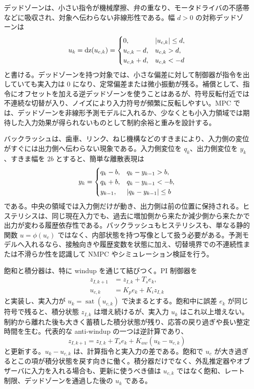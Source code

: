 デッドゾーンは、小さい指令が機械摩擦、弁の重なり、モータドライバの不感帯などに吸収され、対象へ伝わらない非線形性である。幅 $d>0$ の対称デッドゾーンは
\begin{equation}
  u_k=\operatorname{dz}(u_{c,k})=
  \begin{cases}
    0, & \left|u_{c,k}\right|\le d,\\
    u_{c,k}-d, & u_{c,k}>d,\\
    u_{c,k}+d, & u_{c,k}<-d
  \end{cases}
\end{equation}
と書ける。デッドゾーンを持つ対象では、小さな偏差に対して制御器が指令を出していても実入力は 0 になり、定常偏差または微小振動が残る。補償として、指令にオフセットを加える逆デッドゾーンを使うことはあるが、符号反転付近では不連続な切替が入り、ノイズにより入力符号が頻繁に反転しやすい。MPC では、デッドゾーンを非線形予測モデルに入れるか、少なくとも小入力領域では期待した入力効果が得られないものとして制約余裕と重みを設計する。

バックラッシュは、歯車、リンク、ねじ機構などのすきまにより、入力側の変位がすぐには出力側へ伝わらない現象である。入力側変位を $q_k$、出力側変位を $y_k$、すきま幅を $2b$ とすると、簡単な離散表現は
\begin{equation}
  y_k=
  \begin{cases}
    q_k-b, & q_k-y_{k-1}>b,\\
    q_k+b, & q_k-y_{k-1}<-b,\\
    y_{k-1}, & \left|q_k-y_{k-1}\right|\le b
  \end{cases}
\end{equation}
である。中央の領域では入力側だけが動き、出力側は前の位置に保持される。ヒステリシスは、同じ現在入力でも、過去に増加側から来たか減少側から来たかで出力が変わる履歴依存性である。バックラッシュもヒステリシスも、単なる静的関数 $u=\phi(u_c)$ ではなく、内部状態を持つ写像として扱う必要がある。予測モデルへ入れるなら、接触向きや履歴変数を状態に加え、切替境界での不連続性または不滑らか性を認識して NMPC やシミュレーション検証を行う。

飽和と積分器は、特に windup を通じて結びつく。PI 制御器を
\begin{align}
  z_{I,k+1}&=z_{I,k}+T_se_k,\\
  u_{c,k}&=K_pe_k+K_iz_{I,k}
\end{align}
と実装し、実入力が $u_k=\operatorname{sat}(u_{c,k})$ で決まるとする。飽和中に誤差 $e_k$ が同じ符号で残ると、積分状態 $z_{I,k}$ は増え続けるが、実入力 $u_k$ はこれ以上増えない。制約から離れた後も大きく蓄積した積分状態が残り、応答の戻り過ぎや長い整定時間を生む。代表的な anti-windup の一つは逆計算であり、
\begin{equation}
  z_{I,k+1}
  =z_{I,k}+T_se_k
  +K_{aw}(u_k-u_{c,k})
\end{equation}
と更新する。$u_k-u_{c,k}$ は、計算指令と実入力の差である。飽和で $u_c$ が大き過ぎるとこの項が積分状態を戻す向きに働く。積分器だけでなく、外乱推定器やオブザーバに入力を入れる場合も、更新に使うべき値は $u_{c,k}$ ではなく飽和、レート制限、デッドゾーンを通過した後の $u_k$ である。

